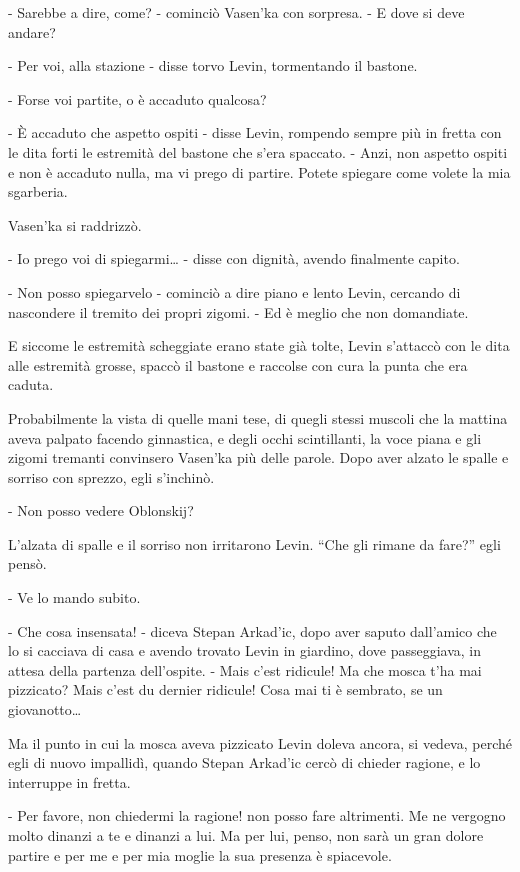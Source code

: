 - Sarebbe a dire, come? - cominciò Vasen'ka con sorpresa. - E dove si deve andare? 

- Per voi, alla stazione - disse torvo Levin, tormentando il bastone. 

- Forse voi partite, o è accaduto qualcosa? 

- È accaduto che aspetto ospiti - disse Levin, rompendo sempre più in fretta con le dita forti le estremità del bastone che s'era spaccato. - Anzi, non aspetto ospiti e non è accaduto nulla, ma vi prego di partire. Potete spiegare come volete la mia sgarberia. 

Vasen'ka si raddrizzò. 

- Io prego voi di spiegarmi\ldots{} - disse con dignità, avendo finalmente capito. 

- Non posso spiegarvelo - cominciò a dire piano e lento Levin, cercando di nascondere il tremito dei propri zigomi. - Ed è meglio che non domandiate. 

E siccome le estremità scheggiate erano state già tolte, Levin s'attaccò con le dita alle estremità grosse, spaccò il bastone e raccolse con cura la punta che era caduta. 

Probabilmente la vista di quelle mani tese, di quegli stessi muscoli che la mattina aveva palpato facendo ginnastica, e degli occhi scintillanti, la voce piana e gli zigomi tremanti convinsero Vasen'ka più delle parole. Dopo aver alzato le spalle e sorriso con sprezzo, egli s'inchinò. 

- Non posso vedere Oblonskij? 

L'alzata di spalle e il sorriso non irritarono Levin. ``Che gli rimane da fare?'' egli pensò. 

- Ve lo mando subito. 

- Che cosa insensata! - diceva Stepan Arkad'ic, dopo aver saputo dall'amico che lo si cacciava di casa e avendo trovato Levin in giardino, dove passeggiava, in attesa della partenza dell'ospite. - Mais c'est ridicule! Ma che mosca t'ha mai pizzicato? Mais c'est du dernier ridicule! Cosa mai ti è sembrato, se un giovanotto\ldots{} 

Ma il punto in cui la mosca aveva pizzicato Levin doleva ancora, si vedeva, perché egli di nuovo impallidì, quando Stepan Arkad'ic cercò di chieder ragione, e lo interruppe in fretta. 

- Per favore, non chiedermi la ragione! non posso fare altrimenti. Me ne vergogno molto dinanzi a te e dinanzi a lui. Ma per lui, penso, non sarà un gran dolore partire e per me e per mia moglie la sua presenza è spiacevole. 

